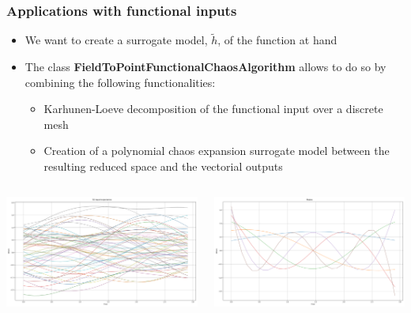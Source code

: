 \documentclass[aspectratio=169]{beamer}
\begin{document}
\begin{frame}[containsverbatim]
\frametitle{Applications with functional inputs}

\begin{itemize}
\item We want to create a surrogate model, $\tilde{h}$, of the function at hand
\item The class \textbf{FieldToPointFunctionalChaosAlgorithm} allows to do so by combining the following functionalities:
\begin{itemize}
\item Karhunen-Loeve decomposition of the functional input over a discrete mesh
\item Creation of a polynomial chaos expansion surrogate model between the resulting reduced space and the vectorial outputs
\end{itemize}
\end{itemize}

  \begin{columns}
\centering
    \includegraphics[width=.9\textwidth]{figures/Trajs.png}

\centering
    \includegraphics[width=.9\textwidth]{figures/KL_Modes.png}
  \end{columns}

\end{frame}
\end{document}
